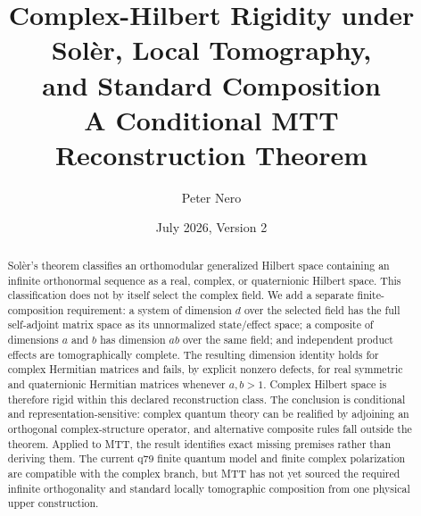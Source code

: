\documentclass[11pt]{article}
\title{Complex-Hilbert Rigidity under Sol\`er, Local Tomography,\\
and Standard Composition\\
\large A Conditional MTT Reconstruction Theorem}
\author{Peter Nero}
\date{July 2026, Version 2}
\begin{document}
\maketitle

\begin{abstract}
Sol\`er's theorem classifies an orthomodular generalized Hilbert space containing an infinite orthonormal sequence as a real, complex, or quaternionic Hilbert space. This classification does not by itself select the complex field. We add a separate finite-composition requirement: a system of dimension \(d\) over the selected field has the full self-adjoint matrix space as its unnormalized state/effect space; a composite of dimensions \(a\) and \(b\) has dimension \(ab\) over the same field; and independent product effects are tomographically complete. The resulting dimension identity holds for complex Hermitian matrices and fails, by explicit nonzero defects, for real symmetric and quaternionic Hermitian matrices whenever \(a,b>1\). Complex Hilbert space is therefore rigid within this declared reconstruction class. The conclusion is conditional and representation-sensitive: complex quantum theory can be realified by adjoining an orthogonal complex-structure operator, and alternative composite rules fall outside the theorem. Applied to MTT, the result identifies exact missing premises rather than deriving them. The current q79 finite quantum model and finite complex polarization are compatible with the complex branch, but MTT has not yet sourced the required infinite orthogonality and standard locally tomographic composition from one physical upper construction.
\end{abstract}
\end{document}
